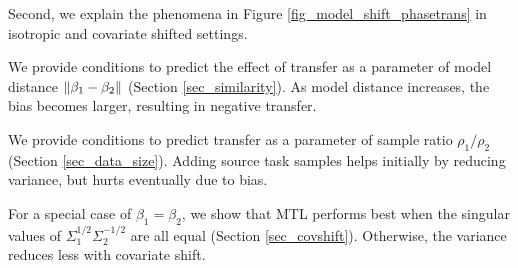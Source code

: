
Second, we explain the phenomena in Figure \ref{fig_model_shift_phasetrans} in isotropic and covariate shifted settings.
\squishlist
	\item We provide conditions to predict the effect of transfer as a parameter of model distance $\|\beta_1-\beta_2\|$ (Section \ref{sec_similarity}).
	As model distance increases, the bias becomes larger, resulting in negative transfer.
	\item We provide conditions to predict transfer as a parameter of sample ratio $\rho_1/\rho_2$ (Section \ref{sec_data_size}).
	Adding source task samples helps initially by reducing variance, but hurts eventually due to bias.
	\item For a special case of $\beta_1=\beta_2$, we show that MTL performs best when the singular values of $\Sigma_1^{1/2}\Sigma_2^{-1/2}$ are all equal  (Section \ref{sec_covshift}).
	Otherwise, the variance reduces less with covariate shift.
